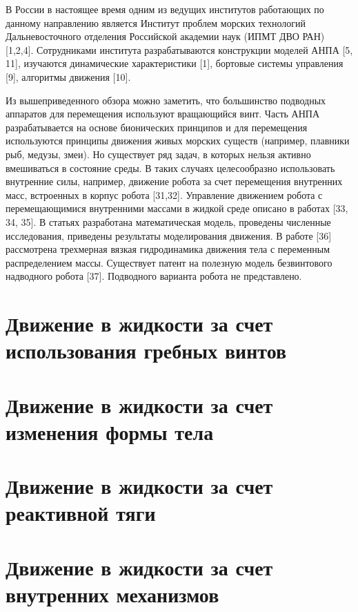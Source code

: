 В России в настоящее время одним из ведущих институтов работающих по данному направлению является Институт проблем морских технологий Дальневосточного отделения Российской академии наук (ИПМТ ДВО РАН) [1,2,4]. Сотрудниками института разрабатываются конструкции моделей АНПА [5, 11], изучаются динамические характеристики [1], бортовые системы управления [9], алгоритмы движения [10].

Из вышеприведенного обзора можно заметить, что большинство подводных аппаратов для перемещения используют вращающийся винт. Часть АНПА разрабатывается на основе бионических принципов и для перемещения используются принципы движения живых морских существ (например, плавники рыб, медузы, змеи). Но существует ряд задач, в которых нельзя активно вмешиваться в состояние среды. В таких случаях целесообразно использовать внутренние силы, например, движение робота за счет перемещения внутренних масс, встроенных в корпус робота [31,32]. Управление движением робота с перемещающимися внутренними массами в жидкой среде описано в работах [33, 34, 35]. В статьях разработана математическая модель, проведены численные исследования, приведены результаты моделирования движения. В работе [36] рассмотрена трехмерная вязкая гидродинамика движения тела с переменным распределением массы. Существует патент на полезную модель безвинтового надводного робота [37]. Подводного варианта робота не представлено.


\section{Движение в жидкости за счет использования гребных винтов}\label{sec:ch1/sec2}


\section{Движение в жидкости за счет изменения формы тела}\label{sec:ch1/sec3}


\section{Движение в жидкости за счет реактивной тяги}\label{sec:ch1/sec4}



\section{Движение в жидкости за счет внутренних механизмов}\label{sec:ch1/sec5}



